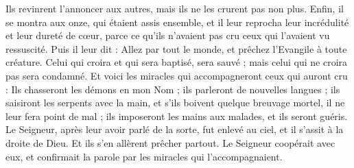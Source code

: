 \begin{multicols}{2}
Ils revinrent l'annoncer aux autres, mais ils ne les crurent pas non plus.
Enfin, il se montra aux onze, qui étaient assis ensemble, et il leur reprocha leur incrédulité et leur dureté de cœur, parce ce qu'ils n'avaient pas cru ceux qui l'avaient vu ressuscité.
Puis il leur dit : Allez par tout le monde, et prêchez l'Evangile à toute créature.
Celui qui croira et qui sera baptisé, sera sauvé ; mais celui qui ne croira pas sera condamné.
Et voici les miracles qui accompagneront ceux qui auront cru : Ils chasseront les démons en mon Nom ; ils parleront de nouvelles langues ;
ils saisiront les serpents avec la main, et s'ils boivent quelque breuvage mortel, il ne leur fera point de mal ; ils imposeront les mains aux malades, et ils seront guéris.
Le Seigneur, après leur avoir parlé de la sorte, fut enlevé au ciel, et il s'assit à la droite de Dieu.
Et ils s'en allèrent prêcher partout. Le Seigneur coopérait avec eux, et confirmait la parole par les miracles qui l'accompagnaient.
\PPE{}
\end{multicols}
